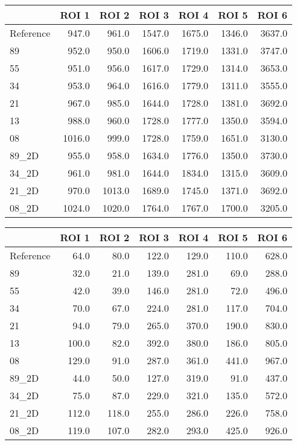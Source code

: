 \begin{tabular}{lrrrrrr}
\toprule
{} &   ROI 1 &   ROI 2 &   ROI 3 &   ROI 4 &   ROI 5 &   ROI 6 \\
\midrule
Reference &   947.0 &   961.0 &  1547.0 &  1675.0 &  1346.0 &  3637.0 \\
89        &   952.0 &   950.0 &  1606.0 &  1719.0 &  1331.0 &  3747.0 \\
55        &   951.0 &   956.0 &  1617.0 &  1729.0 &  1314.0 &  3653.0 \\
34        &   953.0 &   964.0 &  1616.0 &  1779.0 &  1311.0 &  3555.0 \\
21        &   967.0 &   985.0 &  1644.0 &  1728.0 &  1381.0 &  3692.0 \\
13        &   988.0 &   960.0 &  1728.0 &  1777.0 &  1350.0 &  3594.0 \\
08        &  1016.0 &   999.0 &  1728.0 &  1759.0 &  1651.0 &  3130.0 \\
89\_2D     &   955.0 &   958.0 &  1634.0 &  1776.0 &  1350.0 &  3730.0 \\
34\_2D     &   961.0 &   981.0 &  1644.0 &  1834.0 &  1315.0 &  3609.0 \\
21\_2D     &   970.0 &  1013.0 &  1689.0 &  1745.0 &  1371.0 &  3692.0 \\
08\_2D     &  1024.0 &  1020.0 &  1764.0 &  1767.0 &  1700.0 &  3205.0 \\
\bottomrule
\end{tabular}
\begin{tabular}{lrrrrrr}
\toprule
{} &  ROI 1 &  ROI 2 &  ROI 3 &  ROI 4 &  ROI 5 &  ROI 6 \\
\midrule
Reference &   64.0 &   80.0 &  122.0 &  129.0 &  110.0 &  628.0 \\
89        &   32.0 &   21.0 &  139.0 &  281.0 &   69.0 &  288.0 \\
55        &   42.0 &   39.0 &  146.0 &  281.0 &   72.0 &  496.0 \\
34        &   70.0 &   67.0 &  224.0 &  281.0 &  117.0 &  704.0 \\
21        &   94.0 &   79.0 &  265.0 &  370.0 &  190.0 &  830.0 \\
13        &  100.0 &   82.0 &  392.0 &  380.0 &  186.0 &  805.0 \\
08        &  129.0 &   91.0 &  287.0 &  361.0 &  441.0 &  967.0 \\
89\_2D     &   44.0 &   50.0 &  127.0 &  319.0 &   91.0 &  437.0 \\
34\_2D     &   75.0 &   87.0 &  229.0 &  321.0 &  135.0 &  572.0 \\
21\_2D     &  112.0 &  118.0 &  255.0 &  286.0 &  226.0 &  758.0 \\
08\_2D     &  119.0 &  107.0 &  282.0 &  293.0 &  425.0 &  926.0 \\
\bottomrule
\end{tabular}
